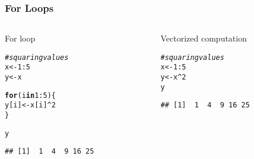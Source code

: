 \documentclass[12pt]{beamer}\usepackage[]{graphicx}\usepackage[]{color}
\makeatletter
\newcommand{\hlnum}[1]{\textcolor[rgb]{0.686,0.059,0.569}{#1}}%
\newcommand{\hlcom}[1]{\textcolor[rgb]{0.678,0.584,0.686}{\textit{#1}}}%
\newcommand{\hlopt}[1]{\textcolor[rgb]{0,0,0}{#1}}%
\newcommand{\hlstd}[1]{\textcolor[rgb]{0.345,0.345,0.345}{#1}}%
\newcommand{\hlkwa}[1]{\textcolor[rgb]{0.161,0.373,0.58}{\textbf{#1}}}%
\newcommand{\hlkwb}[1]{\textcolor[rgb]{0.69,0.353,0.396}{#1}}%
\newenvironment{kframe}{%
 \def\at@end@of@kframe{}%
 \ifinner\ifhmode%
  \def\at@end@of@kframe{\end{minipage}}%
  \begin{minipage}{\columnwidth}%
 \fi\fi%
 \def\FrameCommand##1{\hskip\@totalleftmargin \hskip-\fboxsep
 \colorbox{shadecolor}{##1}\hskip-\fboxsep
     \hskip-\linewidth \hskip-\@totalleftmargin \hskip\columnwidth}%
 \MakeFramed {\advance\hsize-\width
   \@totalleftmargin\z@ \linewidth\hsize
   \@setminipage}}%
 {\par\unskip\endMakeFramed%
 \at@end@of@kframe}
\newenvironment{knitrout}{}{} %
\makeatother
\begin{document}
\begin{frame}[fragile]
\frametitle{For Loops}

\begin{columns}[t]
\begin{column}{0.45\textwidth}
For loop
\begin{knitrout}\footnotesize
{}\color{fgcolor}\begin{kframe}
\begin{alltt}
\hlcom{# squaring values}
\hlstd{x} \hlkwb{<-} \hlnum{1}\hlopt{:}\hlnum{5}
\hlstd{y} \hlkwb{<-} \hlstd{x}

\hlkwa{for} \hlstd{(i} \hlkwa{in} \hlnum{1}\hlopt{:}\hlnum{5}\hlstd{) \{}
  \hlstd{y[i]} \hlkwb{<-} \hlstd{x[i]}\hlopt{^}\hlnum{2}
\hlstd{\}}

\hlstd{y}
\end{alltt}
\begin{verbatim}
## [1]  1  4  9 16 25
\end{verbatim}
\end{kframe}
\end{knitrout}
\end{column}

\begin{column}{0.45\textwidth}
Vectorized computation
\begin{knitrout}\footnotesize
{}\color{fgcolor}\begin{kframe}
\begin{alltt}
\hlcom{# squaring values}
\hlstd{x} \hlkwb{<-} \hlnum{1}\hlopt{:}\hlnum{5}
\hlstd{y} \hlkwb{<-} \hlstd{x}\hlopt{^}\hlnum{2}
\hlstd{y}
\end{alltt}
\begin{verbatim}
## [1]  1  4  9 16 25
\end{verbatim}
\end{kframe}
\end{knitrout}
\end{column}
\end{columns}

\end{frame}

\end{document}
